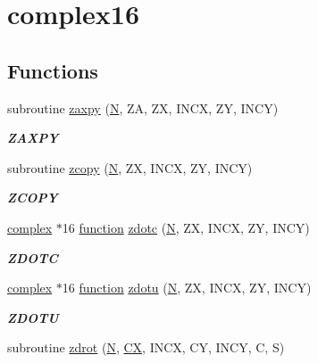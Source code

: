 \hypertarget{group__complex16__blas__level1}{}\section{complex16}
\label{group__complex16__blas__level1}
\subsection*{Functions}
\begin{DoxyCompactItemize}
\item 
subroutine \hyperlink{group__complex16__blas__level1_ga51cb4e3c658f121bdfb5f29a6c0a0bfb}{zaxpy} (\hyperlink{polmisc_8c_a0240ac851181b84ac374872dc5434ee4}{N}, Z\+A, Z\+X, I\+N\+C\+X, Z\+Y, I\+N\+C\+Y)
\begin{DoxyCompactList}\small\item\em {\bfseries Z\+A\+X\+P\+Y} \end{DoxyCompactList}\item 
subroutine \hyperlink{group__complex16__blas__level1_gad9555fe739d307171aa5abedd291631a}{zcopy} (\hyperlink{polmisc_8c_a0240ac851181b84ac374872dc5434ee4}{N}, Z\+X, I\+N\+C\+X, Z\+Y, I\+N\+C\+Y)
\begin{DoxyCompactList}\small\item\em {\bfseries Z\+C\+O\+P\+Y} \end{DoxyCompactList}\item 
\hyperlink{structcomplex}{complex} $\ast$16 \hyperlink{afunc_8m_a7b5e596df91eadea6c537c0825e894a7}{function} \hyperlink{group__complex16__blas__level1_ga45b00bad9285ff50cd86e97dfb04facd}{zdotc} (\hyperlink{polmisc_8c_a0240ac851181b84ac374872dc5434ee4}{N}, Z\+X, I\+N\+C\+X, Z\+Y, I\+N\+C\+Y)
\begin{DoxyCompactList}\small\item\em {\bfseries Z\+D\+O\+T\+C} \end{DoxyCompactList}\item 
\hyperlink{structcomplex}{complex} $\ast$16 \hyperlink{afunc_8m_a7b5e596df91eadea6c537c0825e894a7}{function} \hyperlink{group__complex16__blas__level1_ga25e3992c589a478c5affcc975c6c7b08}{zdotu} (\hyperlink{polmisc_8c_a0240ac851181b84ac374872dc5434ee4}{N}, Z\+X, I\+N\+C\+X, Z\+Y, I\+N\+C\+Y)
\begin{DoxyCompactList}\small\item\em {\bfseries Z\+D\+O\+T\+U} \end{DoxyCompactList}\item 
subroutine \hyperlink{group__complex16__blas__level1_ga28dfedb950adf3316eb1f5af85c2cdb3}{zdrot} (\hyperlink{polmisc_8c_a0240ac851181b84ac374872dc5434ee4}{N}, \hyperlink{scsum1_8c_a5a76da95c549c41790389a76e12fdcb5}{C\+X}, I\+N\+C\+X, C\+Y, I\+N\+C\+Y, C, S)

\end{DoxyCompactItemize}
